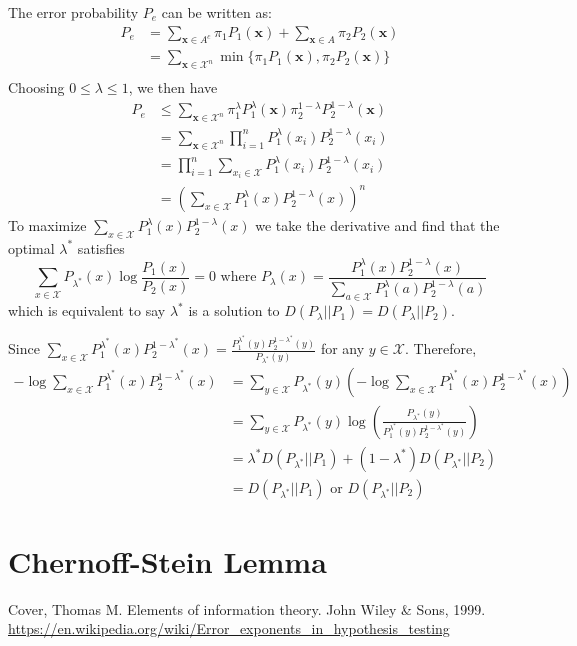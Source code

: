\documentclass{article}
\begin{document}
The error probability $P_e$ can be written as:
\begin{align*}
P_e & = \sum_{\bm{x} \in A^c} \pi_1 P_1(\bm{x})
+ \sum_{\bm{x} \in A} \pi_2 P_2(\bm{x}) \\
& = \sum_{\bm{x} \in \mathcal{X}^n} \min \{ \pi_1 P_1(\bm{x}), \pi_2 P_2(\bm{x})\} \\
\end{align*}
Choosing $ 0 \leq \lambda \leq 1 $,
we then have
\begin{align*}
P_e & \leq \sum_{\bm{x} \in \mathcal{X}^n}  \pi_1^{\lambda} P_1^{\lambda}(\bm{x}) \pi_2^{1-\lambda} P_2^{1-\lambda}(\bm{x}) \\
& =  \sum_{\bm{x} \in \mathcal{X}^n}  \prod_{i=1}^n P_1^{\lambda}(x_i)  P_2^{1-\lambda}(x_i) \\
& = \prod_{i=1}^n \sum_{x_i\in \mathcal{X}} P_1^{\lambda}(x_i)  P_2^{1-\lambda}(x_i) \\
& = \left(\sum_{x\in \mathcal{X}} P_1^{\lambda}(x)  P_2^{1-\lambda}(x)\right)^n
\end{align*}
To maximize $\sum_{x\in \mathcal{X}} P_1^{\lambda}(x)  P_2^{1-\lambda}(x)$ we take the derivative
and find that the optimal $\lambda^*$ satisfies
\begin{equation}
\sum_{x\in \mathcal{X}} P_{\lambda^*}(x) \log \frac{P_1(x)}{P_2(x)} = 0 \textrm{ where }
P_{\lambda}(x) = \frac{P_1^{\lambda}(x)P_2^{1-\lambda}(x)}{\sum_{a\in \mathcal{X}}P_1^{\lambda}(a)P_2^{1-\lambda}(a)}
\end{equation}
which is equivalent to say $\lambda^*$ is a solution to $D(P_{\lambda}|| P_1) = D(P_{\lambda} || P_2)$.

Since $\sum_{x\in \mathcal{X}} P_1^{\lambda^*}(x)  P_2^{1-\lambda^*}(x) = \frac{P_1^{\lambda^*}(y)P_2^{1-\lambda^*}(y)}
{P_{\lambda^*}(y)}$ for any $y\in \mathcal{X}$. Therefore,
\begin{align*}
-\log \sum_{x\in \mathcal{X}} P_1^{\lambda^*}(x)  P_2^{1-\lambda^*}(x) &= \sum_{y \in \mathcal{X}} P_{\lambda^*}(y) \left(-\log \sum_{x\in \mathcal{X}} P_1^{\lambda^*}(x)  P_2^{1-\lambda^*}(x) \right)\\
& = \sum_{y \in \mathcal{X}} P_{\lambda^*}(y) \log\left(\frac{P_{\lambda^*}(y)}{P_1^{\lambda^*}(y)P_2^{1-\lambda^*}(y)}\right) \\
& = \lambda^* D(P_{\lambda^*} || P_1) + (1-\lambda^*) D(P_{\lambda^*} || P_2) \\
& = D(P_{\lambda^*} || P_1) \textrm{ or } D(P_{\lambda^*} || P_2)
\end{align*}
\section{Chernoff-Stein Lemma}

\begin{thebibliography}{9}
	 Cover, Thomas M. Elements of information theory. John Wiley \& Sons, 1999.
	 \url{https://en.wikipedia.org/wiki/Error_exponents_in_hypothesis_testing}
\end{thebibliography}
\end{document}
